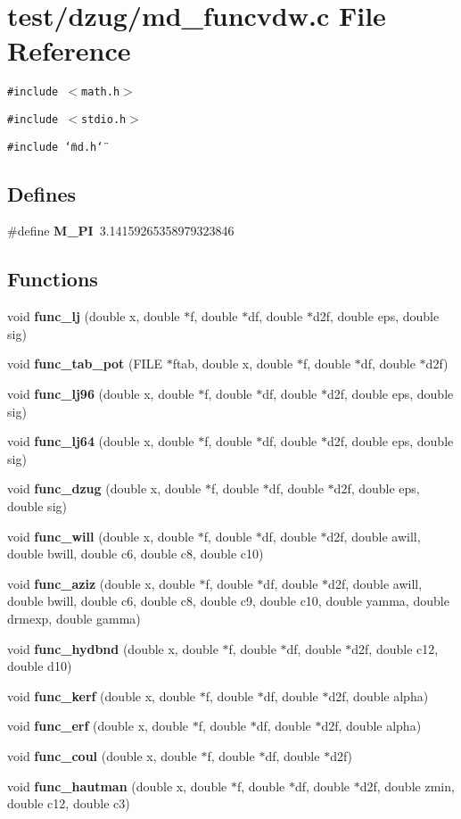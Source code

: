 \section{test/dzug/md\_\-funcvdw.c File Reference}
\label{test_2dzug_2md__funcvdw_8c}
{\tt \#include $<$math.h$>$}\par
{\tt \#include $<$stdio.h$>$}\par
{\tt \#include \char`\"{}md.h\char`\"{}}\par
\subsection*{Defines}
\begin{CompactItemize}
\item 
\#define {\bf M\_\-PI}~3.14159265358979323846
\end{CompactItemize}
\subsection*{Functions}
\begin{CompactItemize}
\item 
void {\bf func\_\-lj} (double x, double $\ast$f, double $\ast$df, double $\ast$d2f, double eps, double sig)
\item 
void {\bf func\_\-tab\_\-pot} (FILE $\ast$ftab, double x, double $\ast$f, double $\ast$df, double $\ast$d2f)
\item 
void {\bf func\_\-lj96} (double x, double $\ast$f, double $\ast$df, double $\ast$d2f, double eps, double sig)
\item 
void {\bf func\_\-lj64} (double x, double $\ast$f, double $\ast$df, double $\ast$d2f, double eps, double sig)
\item 
void {\bf func\_\-dzug} (double x, double $\ast$f, double $\ast$df, double $\ast$d2f, double eps, double sig)
\item 
void {\bf func\_\-will} (double x, double $\ast$f, double $\ast$df, double $\ast$d2f, double awill, double bwill, double c6, double c8, double c10)
\item 
void {\bf func\_\-aziz} (double x, double $\ast$f, double $\ast$df, double $\ast$d2f, double awill, double bwill, double c6, double c8, double c9, double c10, double yamma, double drmexp, double gamma)
\item 
void {\bf func\_\-hydbnd} (double x, double $\ast$f, double $\ast$df, double $\ast$d2f, double c12, double d10)
\item 
void {\bf func\_\-kerf} (double x, double $\ast$f, double $\ast$df, double $\ast$d2f, double alpha)
\item 
void {\bf func\_\-erf} (double x, double $\ast$f, double $\ast$df, double $\ast$d2f, double alpha)
\item 
void {\bf func\_\-coul} (double x, double $\ast$f, double $\ast$df, double $\ast$d2f)
\item 
void {\bf func\_\-hautman} (double x, double $\ast$f, double $\ast$df, double $\ast$d2f, double zmin, double c12, double c3)
\end{CompactItemize}
